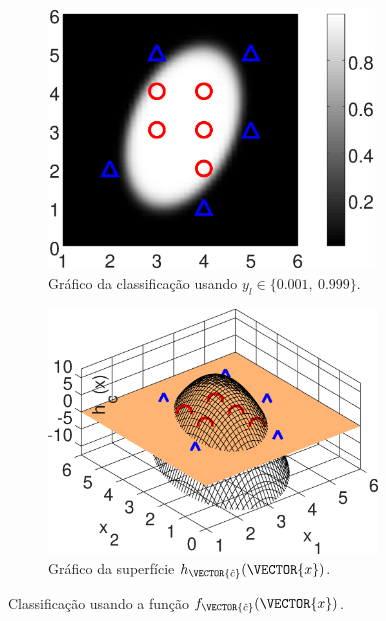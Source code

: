\begin{figure}[!h]
    \begin{subfigure}[t]{0.45\textwidth}
        \centering
        \includegraphics[width=0.95\textwidth]{chapters/classificacao/mfiles/reglogrnr1poly2/ex2s2-reglogrnr1poly.eps}
        \caption{Gráfico da classificação usando $y_l \in \{0.001,~ 0.999\}$.}
        \label{fig:theo:reglogrnr1poly:xn:s3a}
    \end{subfigure}
    \hfill
    \begin{subfigure}[t]{0.45\textwidth}
        \centering
        \includegraphics[width=0.96\textwidth]{chapters/classificacao/mfiles/reglogrnr1poly2/ex2s2-reglogrnr1polyhx.eps}
        \caption{Gráfico da superfície $h_{\VECTOR{\hat{c}}}(\VECTOR{x})$.}
        \label{fig:theo:reglogrnr1poly:xn:s3b}
    \end{subfigure}
    \caption{Classificação usando a função $f_{\VECTOR{\hat{c}}}(\VECTOR{x})$.}
    \label{fig:theo:reglogrnr1poly:xn:s3}
\end{figure}
